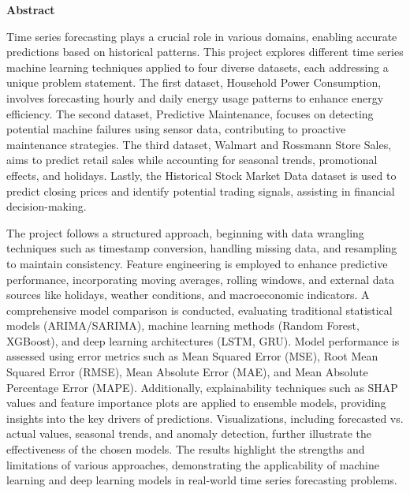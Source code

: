 \newpage
\begin{center}
	\Large \textbf{Abstract}
\end{center}
\vspace{1cm}

\noindent
Time series forecasting plays a crucial role in various domains, enabling accurate predictions based on historical patterns. This project explores different time series machine learning techniques applied to four diverse datasets, each addressing a unique problem statement. The first dataset, Household Power Consumption, involves forecasting hourly and daily energy usage patterns to enhance energy efficiency. The second dataset, Predictive Maintenance, focuses on detecting potential machine failures using sensor data, contributing to proactive maintenance strategies. The third dataset, Walmart and Rossmann Store Sales, aims to predict retail sales while accounting for seasonal trends, promotional effects, and holidays. Lastly, the Historical Stock Market Data dataset is used to predict closing prices and identify potential trading signals, assisting in financial decision-making.  

\vspace{0.5cm}

\noindent
The project follows a structured approach, beginning with data wrangling techniques such as timestamp conversion, handling missing data, and resampling to maintain consistency. Feature engineering is employed to enhance predictive performance, incorporating moving averages, rolling windows, and external data sources like holidays, weather conditions, and macroeconomic indicators. A comprehensive model comparison is conducted, evaluating traditional statistical models (ARIMA/SARIMA), machine learning methods (Random Forest, XGBoost), and deep learning architectures (LSTM, GRU). Model performance is assessed using error metrics such as Mean Squared Error (MSE), Root Mean Squared Error (RMSE), Mean Absolute Error (MAE), and Mean Absolute Percentage Error (MAPE). Additionally, explainability techniques such as SHAP values and feature importance plots are applied to ensemble models, providing insights into the key drivers of predictions. Visualizations, including forecasted vs. actual values, seasonal trends, and anomaly detection, further illustrate the effectiveness of the chosen models. The results highlight the strengths and limitations of various approaches, demonstrating the applicability of machine learning and deep learning models in real-world time series forecasting problems.

\vfill
